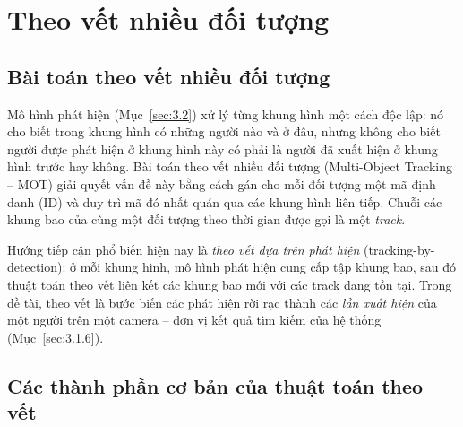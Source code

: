 \section{Theo vết nhiều đối tượng}
\label{sec:3.3}

\subsection{Bài toán theo vết nhiều đối tượng}
\label{sec:3.3.1}

Mô hình phát hiện (Mục~\ref{sec:3.2}) xử lý từng khung hình một cách độc lập: nó cho biết trong khung hình có những người nào và ở đâu, nhưng không cho biết người được phát hiện ở khung hình này có phải là người đã xuất hiện ở khung hình trước hay không. Bài toán theo vết nhiều đối tượng (Multi-Object Tracking -- MOT) giải quyết vấn đề này bằng cách gán cho mỗi đối tượng một mã định danh (ID) và duy trì mã đó nhất quán qua các khung hình liên tiếp. Chuỗi các khung bao của cùng một đối tượng theo thời gian được gọi là một \emph{track}.

Hướng tiếp cận phổ biến hiện nay là \emph{theo vết dựa trên phát hiện} (tracking-by-detection): ở mỗi khung hình, mô hình phát hiện cung cấp tập khung bao, sau đó thuật toán theo vết liên kết các khung bao mới với các track đang tồn tại. Trong đề tài, theo vết là bước biến các phát hiện rời rạc thành các \emph{lần xuất hiện} của một người trên một camera -- đơn vị kết quả tìm kiếm của hệ thống (Mục~\ref{sec:3.1.6}).

\subsection{Các thành phần cơ bản của thuật toán theo vết}
\label{sec:3.3.2}

